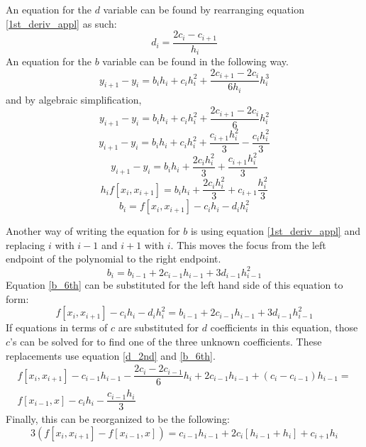 \documentclass[12pt, letterpaper]{article} %
\begin{document}
An equation for the $d$ variable can be found by rearranging equation \ref{1st_deriv_appl} as such:
\begin{equation}
d_i = \dfrac{2c_i - c_{i + 1}}{h_i}
\label{d_2nd}
\end{equation}
An equation for the $b$ variable can be found in the following way.
\begin{equation}
y_{i + 1} - y_i = b_ih_i + c_ih_i^2 + \dfrac{2c_{i + 1} - 2c_i}{6h_i}h_i^3
\label{b_1st}
\end{equation}
and by algebraic simplification,
\begin{equation}
y_{i + 1} - y_i = b_ih_i + c_ih_i^2 + \dfrac{2c_{i + 1} - 2c_i}{6}h_i^2
\label{b_2nd}
\end{equation}
\begin{equation}
y_{i + 1} - y_i = b_ih_i + c_ih_i^2 + \dfrac{c_{i + 1}h_i^2}{3} - \dfrac{c_ih_i^2}{3}
\label{b_3rd}
\end{equation}
\begin{equation}
y_{i + 1} - y_i = b_ih_i + \dfrac{2c_ih_i^2}{3} + \dfrac{c_{i + 1}h_i^2}{3}
\label{b_4th}
\end{equation}
\begin{equation}
h_if[x_i,x_{i+1}] = b_ih_i + \dfrac{2c_ih_i^2}{3} + c_{i+1}\dfrac{h_i^2}{3}
\label{b_5th}
\end{equation}
\begin{equation}
b_i = f[x_i,x_{i+1}] - c_ih_i - d_ih_i^2
\label{b_6th}
\end{equation}

Another way of writing the equation for $b$ is using equation \ref{1st_deriv_appl} and replacing $i$ with $i-1$ and $i+1$ with $i$. This moves the focus from the left endpoint of the polynomial to the right endpoint.
\begin{equation}
b_i = b_{i-1} + 2c_{i-1}h_{i-1} + 3d_{i-1}h_{i-1}^2
\label{2ndary_bi}
\end{equation}
Equation \ref{b_6th} can be substituted for the left hand side of this equation to form:
\begin{equation}
f[x_i,x_{i+1}] - c_ih_i - d_ih_i^2 = b_{i-1} + 2c_{i-1}h_{i-1} + 3d_{i-1}h_{i-1}^2
\end{equation}
If equations in terms of $c$ are substituted for $d$ coefficients in this equation, those $c$'s can be solved for to find one of the three unknown coefficients. These replacements use equation \ref{d_2nd} and \ref{b_6th}.
\begin{multline}
f[x_i,x_{i+1}] - c_{i-1}h_{i-1} - \dfrac{2c_i-2c_{i-1}}{6}h_i + 2c_{i-1}h_{i-1} + (c_i-c_{i-1})h_{i-1} = \\ f[x_{i-1},x] - c_ih_i - \dfrac{c_{i-1}h_i}{3}
\label{big_ass_equation}
\end{multline}
Finally, this can be reorganized to be the following:
\begin{equation}
3(f[x_i,x_{i+1}] - f[x_{i-1},x]) =
c_{i-1}h_{i-1} + 2c_i[h_{i-1}+h_i] + c_{i+1}h_i
\label{big_ass_equation_2}
\end{equation}
\end{document}
